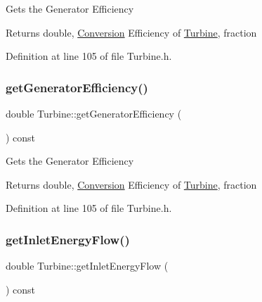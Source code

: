 Gets the Generator Efficiency

\begin{DoxyReturn}{Returns}
double, \hyperlink{class_conversion}{Conversion} Efficiency of \hyperlink{class_turbine}{Turbine}, fraction 
\end{DoxyReturn}


Definition at line 105 of file Turbine.\+h.

\mbox{\label{class_turbine_a92266fd994310d1842ba37c05bc40bf8}} 
\subsubsection{\texorpdfstring{get\+Generator\+Efficiency()}{getGeneratorEfficiency()}\hspace{0.1cm}{\footnotesize\ttfamily [3/3]}}
{\footnotesize\ttfamily double Turbine\+::get\+Generator\+Efficiency (\begin{DoxyParamCaption}{ }\end{DoxyParamCaption}) const\hspace{0.3cm}{\ttfamily [inline]}}

Gets the Generator Efficiency

\begin{DoxyReturn}{Returns}
double, \hyperlink{class_conversion}{Conversion} Efficiency of \hyperlink{class_turbine}{Turbine}, fraction 
\end{DoxyReturn}


Definition at line 105 of file Turbine.\+h.

\mbox{\label{class_turbine_ae5d55a7b882e4780d490d43409f8f06c}} 
\subsubsection{\texorpdfstring{get\+Inlet\+Energy\+Flow()}{getInletEnergyFlow()}\hspace{0.1cm}{\footnotesize\ttfamily [1/3]}}
{\footnotesize\ttfamily double Turbine\+::get\+Inlet\+Energy\+Flow (\begin{DoxyParamCaption}{ }\end{DoxyParamCaption}) const\hspace{0.3cm}{\ttfamily [inline]}}

